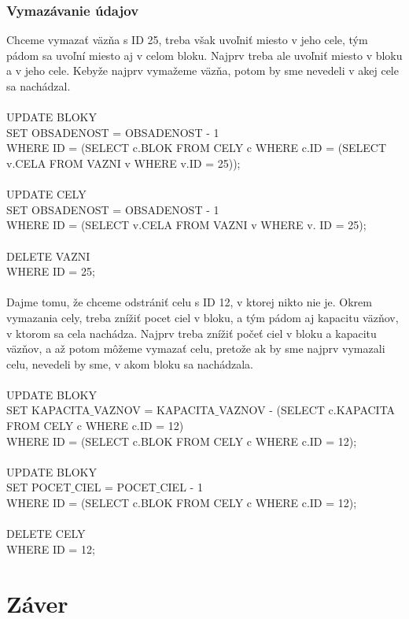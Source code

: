 \documentclass[slovak, 12pt, Times New Roman]{article}
\begin{document}
			\subsubsection{Vymazávanie údajov}
				Chceme vymazať väzňa s ID 25, treba však uvoľniť miesto v jeho cele, tým pádom sa uvoľní miesto aj v celom bloku.
				Najprv treba ale uvoľniť miesto v bloku a v jeho cele. Kebyže najprv vymažeme väzňa, potom by sme nevedeli v akej cele sa nachádzal. \\
				\\
				UPDATE BLOKY\\
				SET OBSADENOST = OBSADENOST - 1\\
				WHERE ID = (SELECT c.BLOK FROM CELY c WHERE c.ID = (SELECT v.CELA FROM VAZNI v WHERE v.ID = 25));\\
				\\
				UPDATE CELY\\
				SET OBSADENOST = OBSADENOST - 1\\
				WHERE ID = (SELECT v.CELA FROM VAZNI v WHERE v. ID = 25);\\
				\\
				DELETE VAZNI\\
				WHERE ID = 25;\\
				\\
				Dajme tomu, že chceme odstrániť celu s ID 12, v ktorej nikto nie je. Okrem vymazania cely, treba znížiť pocet ciel v bloku, a tým pádom aj kapacitu väzňov, v ktorom sa cela nachádza. Najprv treba znížiť počeť ciel v bloku a kapacitu väzňov, a až potom môžeme vymazať celu, pretože ak by sme najprv vymazali celu, nevedeli by sme, v akom bloku sa nachádzala.\\
				\\
				UPDATE BLOKY\\
				SET KAPACITA$\_$VAZNOV = KAPACITA$\_$VAZNOV - (SELECT c.KAPACITA FROM CELY c WHERE c.ID = 12)\\
				WHERE ID = (SELECT c.BLOK FROM CELY c WHERE c.ID = 12);\\
				\\
				UPDATE BLOKY\\
				SET POCET$\_$CIEL = POCET$\_$CIEL - 1\\
				WHERE ID = (SELECT c.BLOK FROM CELY c WHERE c.ID = 12);\\
				\\
				DELETE CELY\\
				WHERE ID = 12;\\
	\section{Záver}
\end{document}
